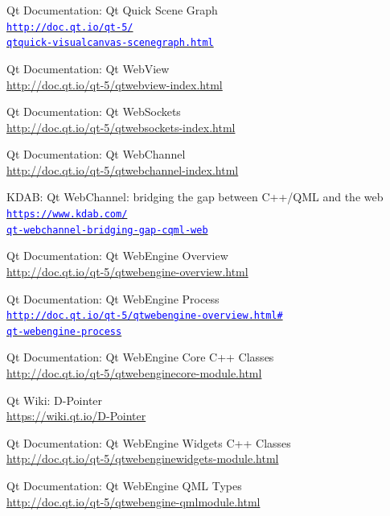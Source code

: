 \documentclass[12pt]{report}
\let\orighref\href
\renewcommand{\href}[2]{%
    \orighref{#1}{\textcolor{blue}{\texttt{#2}}}
}
\let\origurl\url
\renewcommand{\url}[1]{%
    \textcolor{blue}{\origurl{#1}}
}
\begin{document}
\begin{thebibliography}{9}
        Qt Documentation: Qt Quick Scene Graph \\
        \href{http://doc.qt.io/qt-5/qtquick-visualcanvas-scenegraph.html}
        {http://doc.qt.io/qt-5/\\
        qtquick-visualcanvas-scenegraph.html}

        Qt Documentation: Qt WebView \\
        \url{http://doc.qt.io/qt-5/qtwebview-index.html}

        Qt Documentation: Qt WebSockets \\
        \url{http://doc.qt.io/qt-5/qtwebsockets-index.html}

        Qt Documentation: Qt WebChannel \\
        \url{http://doc.qt.io/qt-5/qtwebchannel-index.html}

        KDAB: Qt WebChannel: bridging the gap between C++/QML and the web \\
        \href{https://www.kdab.com/qt-webchannel-bridging-gap-cqml-web}
        {https://www.kdab.com/\\
        qt-webchannel-bridging-gap-cqml-web}

        Qt Documentation: Qt WebEngine Overview \\
        \url{http://doc.qt.io/qt-5/qtwebengine-overview.html}

        Qt Documentation: Qt WebEngine Process \\
        \href{http://doc.qt.io/qt-5/qtwebengine-overview.html\#qt-webengine-process}
        {http://doc.qt.io/qt-5/qtwebengine-overview.html\#\\
        qt-webengine-process}

        Qt Documentation: Qt WebEngine Core C++ Classes \\
        \url{http://doc.qt.io/qt-5/qtwebenginecore-module.html}

        Qt Wiki: D-Pointer \\
        \url{https://wiki.qt.io/D-Pointer}

        Qt Documentation: Qt WebEngine Widgets C++ Classes \\
        \url{http://doc.qt.io/qt-5/qtwebenginewidgets-module.html}

        Qt Documentation: Qt WebEngine QML Types \\
        \url{http://doc.qt.io/qt-5/qtwebengine-qmlmodule.html}

\end{thebibliography}
\end{document}
